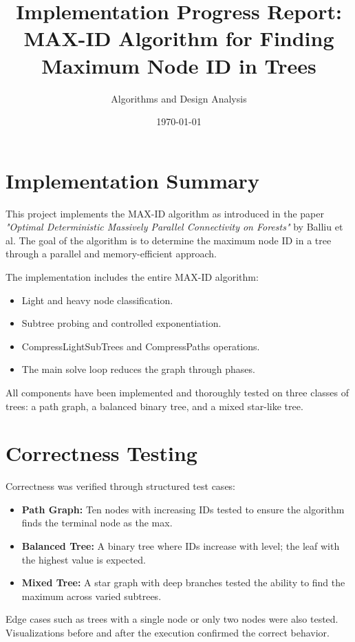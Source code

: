 \documentclass[12pt]{article}
\title{Implementation Progress Report: MAX-ID Algorithm for Finding Maximum Node ID in Trees}
\author{Algorithms and Design Analysis}
\date{\today}
\begin{document}
\maketitle

\section*{Implementation Summary}
This project implements the MAX-ID algorithm as introduced in the paper \textit{"Optimal Deterministic Massively Parallel Connectivity on Forests"} by Balliu et al. The goal of the algorithm is to determine the maximum node ID in a tree through a parallel and memory-efficient approach.

The implementation includes the entire MAX-ID algorithm:
\begin{itemize}
    \item Light and heavy node classification.
    \item Subtree probing and controlled exponentiation.
    \item CompressLightSubTrees and CompressPaths operations.
    \item The main solve loop reduces the graph through phases.
\end{itemize}

All components have been implemented and thoroughly tested on three classes of trees: a path graph, a balanced binary tree, and a mixed star-like tree.

\section*{Correctness Testing}
Correctness was verified through structured test cases:
\begin{itemize}
    \item \textbf{Path Graph:} Ten nodes with increasing IDs tested to ensure the algorithm finds the terminal node as the max.
    \item \textbf{Balanced Tree:} A binary tree where IDs increase with level; the leaf with the highest value is expected.
    \item \textbf{Mixed Tree:} A star graph with deep branches tested the ability to find the maximum across varied subtrees.
\end{itemize}

Edge cases such as trees with a single node or only two nodes were also tested. Visualizations before and after the execution confirmed the correct behavior.
\end{document}
